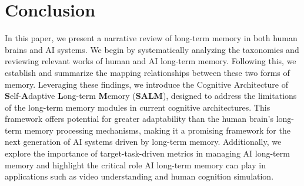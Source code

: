 \documentclass[journal,hideappendix]{vgtc}
\begin{document}
\section{Conclusion}

In this paper, we present a narrative review of long-term memory in both human brains and AI systems. We begin by systematically analyzing the taxonomies and reviewing relevant works of human and AI long-term memory. Following this, we establish and summarize the mapping relationships between these two forms of memory. Leveraging these findings, we introduce the Cognitive Architecture of \textbf{S}elf-\textbf{A}daptive \textbf{L}ong-term \textbf{M}emory (\textbf{SALM}), designed to address the limitations of the long-term memory modules in current cognitive architectures. This framework offers potential for greater adaptability than the human brain's long-term memory processing mechanisms, making it a promising framework for the next generation of AI systems driven by long-term memory. Additionally, we explore the importance of target-task-driven metrics in managing AI long-term memory and highlight the critical role AI long-term memory can play in applications such as video understanding and human cognition simulation.


\renewcommand{\thesection}{\Alph{section}} %
\renewcommand{\thesubsection}{\thesection.\arabic{subsection}} %



\end{document}
